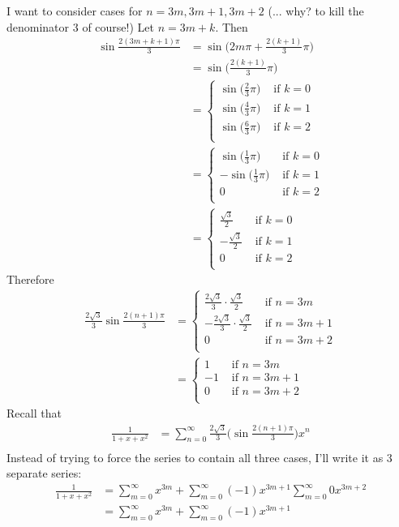 I want to consider cases for $n = 3m, 3m+1, 3m+2$ (... why? to kill the 
denominator 3 of course!)
Let $n = 3m + k$. 
Then 
\begin{align*}
\sin \frac{2(3m+k+1)\pi}{3}
&= \sin \biggl( 2m\pi  + \frac{2(k+1)}{3} \pi \biggr) \\
&= \sin \biggl( \frac{2(k+1)}{3} \pi \biggr) \\
&=
\begin{cases}
\sin \bigl( \frac{2}{3} \pi \bigr) &\text{ if } k = 0 \\
\sin \bigl( \frac{4}{3} \pi \bigr) &\text{ if } k = 1 \\
\sin \bigl( \frac{6}{3} \pi \bigr) &\text{ if } k = 2 \\
\end{cases} \\
&=
\begin{cases}
\sin \bigl( \frac{1}{3} \pi \bigr) &\text{ if } k = 0 \\
-\sin \bigl( \frac{1}{3} \pi \bigr) &\text{ if } k = 1 \\
0 &\text{ if } k = 2 \\
\end{cases} \\
&=
\begin{cases}
\frac{\sqrt{3}}{2} &\text{ if } k = 0 \\
-\frac{\sqrt{3}}{2} &\text{ if } k = 1 \\
0 &\text{ if } k = 2 \\
\end{cases}
\end{align*}
Therefore
\begin{align*}
\frac{2\sqrt{3}}{3} \sin \frac{2(n+1)\pi}{3}
&= 
\begin{cases}
\frac{2\sqrt{3}}{3} \cdot \frac{\sqrt{3}}{2} &\text{ if } n = 3m \\
-\frac{2\sqrt{3}}{3} \cdot \frac{\sqrt{3}}{2} &\text{ if } n = 3m+1 \\
0 &\text{ if } n = 3m+2 \\
\end{cases} \\
&= 
\begin{cases}
1 &\text{ if } n = 3m \\
-1 &\text{ if } n = 3m+1 \\
0 &\text{ if } n = 3m+2 \\
\end{cases}
\end{align*}
Recall that
\begin{align*}
\frac{1}{1 + x + x^2}
&= 
\sum_{n=0}^\infty
\frac{2\sqrt{3}}{3} 
\biggl( \sin \frac{2(n+1)\pi}{3} \biggr)
x^n \\
\end{align*}
Instead of trying to force the series to contain all three cases,
I'll write it as 3 separate series:
\begin{align*}
\frac{1}{1 + x + x^2}
&= 
\sum_{m=0}^\infty x^{3m} +
\sum_{m=0}^\infty (-1)x^{3m+1}
\sum_{m=0}^\infty 0x^{3m+2} \\
&= 
\sum_{m=0}^\infty x^{3m} +
\sum_{m=0}^\infty (-1)x^{3m+1}
\end{align*}


